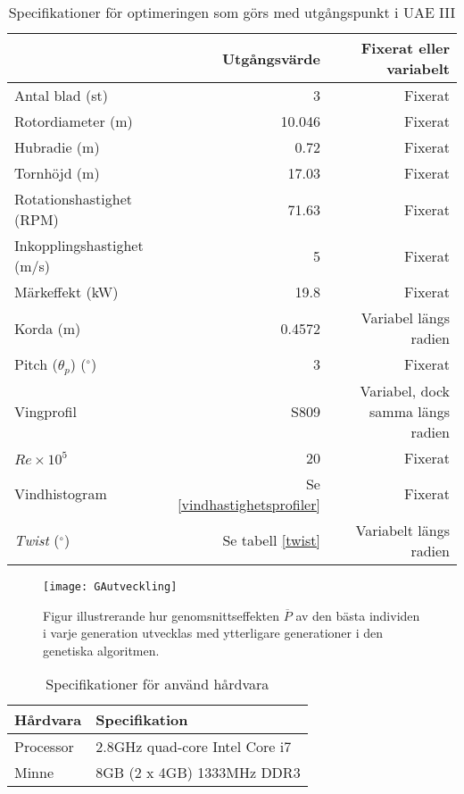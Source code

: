 \bigskip
\begin{table}[!htb]
  \centering
  
    \begin{tabular}{lrr}
    \toprule
        & Utgångsvärde & Fixerat eller variabelt \\
    \midrule
    Antal blad (st)  & 3  & Fixerat \\
    Rotordiameter (m) &  10.046   & Fixerat    \\
    Hubradie (m) &  0.72  & Fixerat     \\
    Tornhöjd (m)       & 17.03     & Fixerat      \\
    Rotationshastighet (RPM) & 71.63 & Fixerat     \\
    Inkopplingshastighet (m/s) & 5 & Fixerat      \\
    Märkeffekt (kW) & 19.8 & Fixerat \\
    Korda (m) & 0.4572 & Variabel längs radien \\
    Pitch ($\theta_p$) ($^{\circ}$) & 3 & Fixerat \\
    Vingprofil & S809 & Variabel, dock samma längs radien  \\
    $Re\times10^5$ & 20 & Fixerat \\
    Vindhistogram & Se \ref{vindhastighetsprofiler} & Fixerat \\

    \emph{Twist} ($^{\circ}$) & Se tabell \ref{twist} & Variabelt längs radien
    \bottomrule
    \end{tabular}
  \caption{Specifikationer för optimeringen som görs med utgångspunkt i UAE III}
  \label{optimeringsspec}
\end{table}

\begin{figure}[!htb]
  \centering
  \texttt{[image: GAutveckling]}
  \caption{Figur illustrerande hur genomsnittseffekten $\overline{P}$ av den bästa individen i varje generation utvecklas med ytterligare generationer i den genetiska algoritmen.}
  \label{GAutveckling}
\end{figure}


\bigskip
\begin{table}[!htb]
  \centering
  
    \begin{tabular}{ll}
    \toprule
    Hårdvara & Specifikation \\
    \midrule
    Processor  & 2.8GHz quad-core Intel Core i7 \\
    Minne & 8GB (2 x 4GB) 1333MHz DDR3
    \bottomrule
    \end{tabular}
  \caption{Specifikationer för använd hårdvara}
  \label{datorspec}
\end{table}


